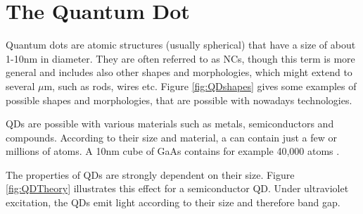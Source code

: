 \chapter{The Quantum Dot} \label{sec:QuantumDot} 

	Quantum dots are atomic structures (usually spherical) that have a size of about 1-10nm in diameter. They are often referred to as \glspl{NC}, though this
	term is more general and includes also other shapes and morphologies, which might extend to several $\mu$m, such as rods, wires etc.
	Figure \ref{fig:QDshapes} gives some examples of possible shapes and morphologies, that are possible with nowadays technologies.
	
	\glspl{QD} are possible with various materials such as metals, semiconductors and compounds. According to their size and material,
	a  can contain just a few or millions of atoms. A 10nm cube of GaAs contains for example 40,000 atoms \cite{SalehTeich}.
	
	The properties of \glspl{QD} are strongly dependent on their size. Figure \ref{fig:QDTheory} illustrates this effect for a semiconductor \gls{QD}.
	Under ultraviolet excitation, the \glspl{QD} emit light according to their size and therefore band gap.
	
